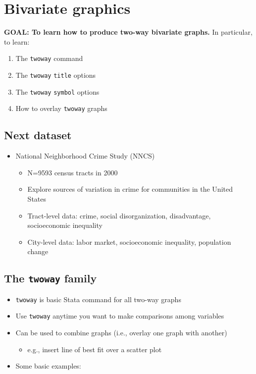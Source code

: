 \documentclass[
]{book}
\providecommand{\tightlist}{%
  \setlength{\itemsep}{0pt}\setlength{\parskip}{0pt}}
\begin{document}
\hypertarget{bivariate-graphics}{%
\section{Bivariate graphics}\label{bivariate-graphics}}

\textbf{GOAL: To learn how to produce two-way bivariate graphs.} In particular, to learn:

\begin{enumerate}
\def\labelenumi{\arabic{enumi}.}
\tightlist
\item
  The \texttt{twoway} command
\item
  The \texttt{twoway} \texttt{title} options
\item
  The \texttt{twoway} \texttt{symbol} options
\item
  How to overlay \texttt{twoway} graphs
\end{enumerate}

\hypertarget{next-dataset}{%
\subsection{Next dataset}\label{next-dataset}}

\begin{itemize}
\tightlist
\item
  National Neighborhood Crime Study (NNCS)

  \begin{itemize}
  \tightlist
  \item
    N=9593 census tracts in 2000
  \item
    Explore sources of variation in crime for communities in the United States
  \item
    Tract-level data: crime, social disorganization, disadvantage, socioeconomic inequality
  \item
    City-level data: labor market, socioeconomic inequality, population change
  \end{itemize}
\end{itemize}

\hypertarget{the-twoway-family}{%
\subsection{\texorpdfstring{The \texttt{twoway} family}{The twoway family}}\label{the-twoway-family}}

\begin{itemize}
\tightlist
\item
  \texttt{twoway} is basic Stata command for all two-way graphs
\item
  Use \texttt{twoway} anytime you want to make comparisons among variables
\item
  Can be used to combine graphs (i.e., overlay one graph with another)

  \begin{itemize}
  \tightlist
  \item
    e.g., insert line of best fit over a scatter plot
  \end{itemize}
\item
  Some basic examples:
\end{itemize}
\end{document}
